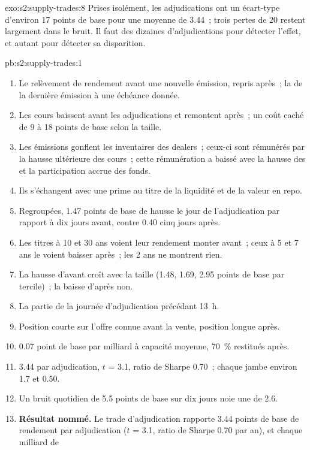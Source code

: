 \begin{solution}{exo:s2:supply-trades:8}
Prises isolément, les adjudications ont un écart-type d'environ 17 points de base pour une moyenne de 3.44~; trois pertes de 20 restent largement dans le bruit. Il faut
des dizaines d'adjudications pour détecter l'effet, et autant pour détecter sa disparition.
\end{solution}

\begin{solution}{pb:s2:supply-trades:1}
\begin{enumerate}
\item Le relèvement de rendement avant une nouvelle émission, repris après~; la  de la dernière émission à une échéance donnée.
\item Les cours baissent avant les adjudications et remontent après~; un coût caché de 9 à 18 points de base selon la taille.
\item Les émissions gonflent les inventaires des dealers~; ceux-ci sont rémunérés par la hausse ultérieure des cours~; cette rémunération a baissé avec la hausse des  et la participation accrue des
fonds.
\item Ils s'échangent avec une prime au titre de la liquidité et de la valeur en repo.
\item Regroupées, 1.47 points de base de hausse le jour de l'adjudication par rapport à dix jours avant, contre 0.40 cinq jours après.
\item Les titres à 10 et 30 ans voient leur rendement monter avant~; ceux à 5 et 7 ans le voient baisser après~; les 2 ans ne montrent rien.
\item La hausse d'avant croît avec la taille (1.48, 1.69, 2.95 points de base par tercile)~; la baisse d'après non.
\item La partie de la journée d'adjudication précédant 13~h.
\item Position courte sur l'offre connue avant la vente, position longue après.
\item 0.07 point de base par milliard à capacité moyenne, 70~\% restitués après.
\item 3.44 par adjudication, $t$ = 3.1, ratio de Sharpe 0.70~; chaque jambe environ 1.7 et 0.50.
\item Un bruit quotidien de 5.5 points de base sur dix jours noie une  de 2.6.
\item \textbf{Résultat nommé.} Le trade d'adjudication rapporte 3.44 points de base de rendement par adjudication ($t$ = 3.1, ratio de Sharpe 0.70 par an), et chaque milliard de

\end{enumerate}
\end{solution}
